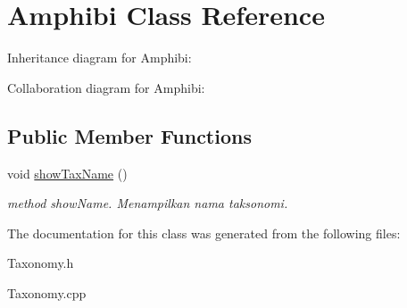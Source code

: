 \hypertarget{classAmphibi}{}\section{Amphibi Class Reference}
\label{classAmphibi}


Inheritance diagram for Amphibi\+:


Collaboration diagram for Amphibi\+:
\subsection*{Public Member Functions}
\begin{DoxyCompactItemize}
\item 
void \hyperlink{classAmphibi_aee82336be6761e469bbab4388c806bc3}{show\+Tax\+Name} ()\hypertarget{classAmphibi_aee82336be6761e469bbab4388c806bc3}{}\label{classAmphibi_aee82336be6761e469bbab4388c806bc3}

\begin{DoxyCompactList}\small\item\em method show\+Name. Menampilkan nama taksonomi. \end{DoxyCompactList}\end{DoxyCompactItemize}


The documentation for this class was generated from the following files\+:\begin{DoxyCompactItemize}
\item 
Taxonomy.\+h\item 
Taxonomy.\+cpp\end{DoxyCompactItemize}
